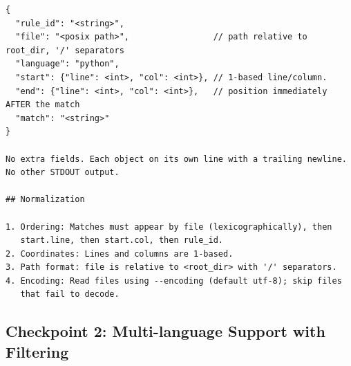\begin{lstlisting}[style=specblock, caption={Specification for \texttt{code\_search} checkpoint 1}, label={lst:code-search-cp1}]
{
  "rule_id": "<string>",
  "file": "<posix path>",                 // path relative to root_dir, '/' separators
  "language": "python",
  "start": {"line": <int>, "col": <int>}, // 1-based line/column.
  "end": {"line": <int>, "col": <int>},   // position immediately AFTER the match
  "match": "<string>"
}

No extra fields. Each object on its own line with a trailing newline.
No other STDOUT output.

## Normalization

1. Ordering: Matches must appear by file (lexicographically), then
   start.line, then start.col, then rule_id.
2. Coordinates: Lines and columns are 1-based.
3. Path format: file is relative to <root_dir> with '/' separators.
4. Encoding: Read files using --encoding (default utf-8); skip files
   that fail to decode.
\end{lstlisting}

\subsection{Checkpoint 2: Multi-language Support with Filtering}
\label{sec:appendix-cp2}

